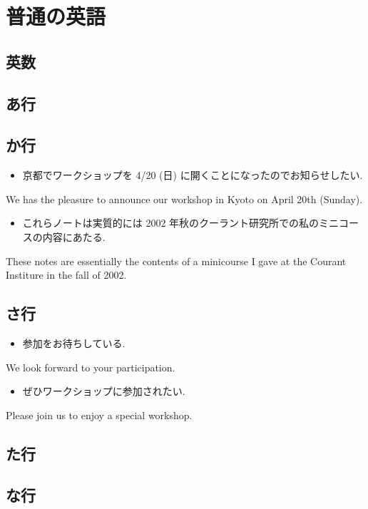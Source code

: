 \documentclass[openany, a4paper, oneside]{jsbook}
\begin{document}
\chapter{普通の英語}

\section{英数}

\section{あ行}

\section{か行}

\begin{itemize}
\item 京都でワークショップを 4/20 (日) に開くことになったのでお知らせしたい.
\end{itemize}
We has the pleasure to announce our workshop in Kyoto on April 20th (Sunday).

\begin{itemize}
\item これらノートは実質的には 2002 年秋のクーラント研究所での私のミニコースの内容にあたる. \cite{VSVaradarajan1}
\end{itemize}
These notes are essentially the contents of a minicourse I gave
at the Courant Institure in the fall of 2002.
\section{さ行}

\begin{itemize}
\item 参加をお待ちしている.
\end{itemize}
We look forward to your participation.

\begin{itemize}
\item ぜひワークショップに参加されたい.
\end{itemize}
Please join us to enjoy a special workshop.
\section{た行}

\section{な行}
\end{document}
